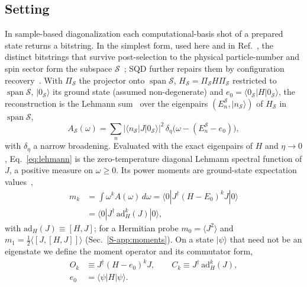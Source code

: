 \documentclass[aps,prb,reprint,onecolumn,12pt,superscriptaddress,longbibliography,floatfix]{revtex4-2}
\begin{document}
\subsection{Setting}
\label{sec:setting}
In sample-based diagonalization each computational-basis shot of a prepared state returns a bitstring. In the simplest form, used here and in Ref.~\cite{SQDspec2608}, the distinct bitstrings that survive post-selection to the physical particle-number and spin sector form the subspace $\mathcal S$~\cite{QSCI2023}; SQD further repairs them by configuration recovery~\cite{SQDchem2025}. With $\Pi_\mathcal S$ the projector onto $\operatorname{span}\mathcal S$, $H_\mathcal S=\Pi_\mathcal SH\Pi_\mathcal S$ restricted to $\operatorname{span}\mathcal S$, $|0_\mathcal S\rangle$ its ground state (assumed non-degenerate) and $e_0=\langle 0_\mathcal S|H|0_\mathcal S\rangle$, the reconstruction is the Lehmann sum~\cite{Lehmann1954} over the eigenpairs $(E_n^\mathcal S,|n_\mathcal S\rangle)$ of $H_\mathcal S$ in $\operatorname{span}\mathcal S$,
\begin{equation}
A_\mathcal S(\omega)=\sum_n|\langle n_\mathcal S|J|0_\mathcal S\rangle|^2\,\delta_\eta\big(\omega-(E_n^\mathcal S-e_0)\big),
\label{eq:lehmann}
\end{equation}
with $\delta_\eta$ a narrow broadening. Evaluated with the exact eigenpairs of $H$ and $\eta\to0$, Eq.~\eqref{eq:lehmann} is the zero-temperature diagonal Lehmann spectral function of $J$, a positive measure on $\omega\ge0$. Its power moments are ground-state expectation values~\cite{HohenbergMartin1965},
\begin{equation}
\begin{split}
m_k&=\int\omega^kA(\omega)\,d\omega=\langle 0|J^\dagger(H-E_0)^kJ|0\rangle\\
&=\langle 0|J^\dagger\,\mathrm{ad}_H^{k}(J)|0\rangle ,
\end{split}
\label{eq:moment-identity}
\end{equation}
with $\mathrm{ad}_H(J)\equiv[H,J]$; for a Hermitian probe $m_0=\langle J^2\rangle$ and $m_1=\tfrac12\langle[J,[H,J]]\rangle$ (Sec.~\ref{S-app:moments}). On a state $|\psi\rangle$ that need not be an eigenstate we define the moment operator and its commutator form,
\begin{equation}
\begin{split}
O_k&\equiv J^\dagger(H-e_0)^kJ,\qquad C_k\equiv J^\dagger\,\mathrm{ad}_H^{k}(J),\\
e_0&=\langle\psi|H|\psi\rangle .
\end{split}
\label{eq:Ok}
\end{equation}
\end{document}
